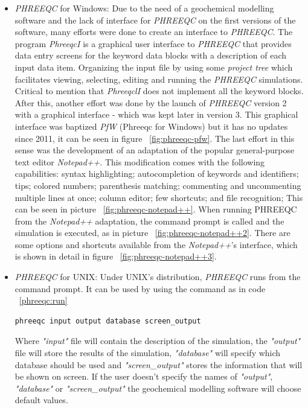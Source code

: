 \documentclass[ppgc,mestrado,english]{iiufrgs}
\begin{document}
\begin{itemize}
\item \emph{PHREEQC} for Windows: Due to the need of a geochemical modelling software and the lack of interface for \emph{PHREEQC} on the first versions of the software, many efforts were done to create an interface to \emph{PHREEQC}. The program \emph{PhreeqcI} is a graphical user interface to \emph{PHREEQC} that provides data entry screens for the keyword data blocks with a description of each input data item. Organizing the input file by using some \emph{project tree} which facilitates viewing, selecting, editing and running the \emph{PHREEQC} simulations. Critical to mention that \emph{PhreeqclI} does not implement all the keyword blocks. After this, another effort was done by the launch of \emph{PHREEQC} version 2 with a graphical interface - which was kept later in version 3. This graphical interface was baptized \emph{PfW} (Phreeqc for Windows) but it has no updates since 2011, it can be seen in figure ~\ref{fig:phreeqc-pfw}. The last effort in this sense was the development of an adaptation of the popular general-purpose text editor \emph{Notepad++}. This modification comes with the following capabilities: syntax highlighting; autocompletion of keywords and identifiers; tips; colored numbers; parenthesis matching; commenting and uncommenting multiple lines at once; column editor; few shortcuts; and file recognition; This can be seen in picture ~\ref{fig:phreeqc-notepad++}. When running PHREEQC from the \emph{Notepad++} adaptation, the command prompt is called and the simulation is executed, as in picture ~\ref{fig:phreeqc-notepad++2}. There are some options and shortcuts available from the \emph{Notepad++}'s interface, which is shown in detail in figure ~\ref{fig:phreeqc-notepad++3}.
\item \emph{PHREEQC} for UNIX: Under UNIX's distribution, \emph{PHREEQC} runs from the command prompt. It can be used by using the command as in code ~\ref{phreeqc:run}
\begin{lstlisting}[frame=single, caption=Command to run UNIX's \emph{PHREEQC}, label=phreeqc:run]
phreeqc input output database screen_output
\end{lstlisting}
Where \emph{"input"} file will contain the description of the simulation, the \emph{"output"} file will store the results of the simulation, \emph{"database"} will specify which database should be used and \emph{"screen\_output"} stores the information that will be shown on screen. If the user doesn't specify the names of \emph{"output"}, \emph{"database"} or \emph{"screen\_output"} the geochemical modelling software will choose default values.
\end{itemize}
\end{document}
